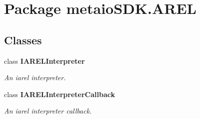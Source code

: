 \section{Package metaio\-S\-D\-K.\-A\-R\-E\-L}
\label{namespacemetaio_s_d_k_1_1_a_r_e_l}
\subsection*{Classes}
\begin{DoxyCompactItemize}
\item 
class {\bf I\-A\-R\-E\-L\-Interpreter}
\begin{DoxyCompactList}\small\item\em An iarel interpreter. \end{DoxyCompactList}\item 
class {\bf I\-A\-R\-E\-L\-Interpreter\-Callback}
\begin{DoxyCompactList}\small\item\em An iarel interpreter callback. \end{DoxyCompactList}\end{DoxyCompactItemize}
